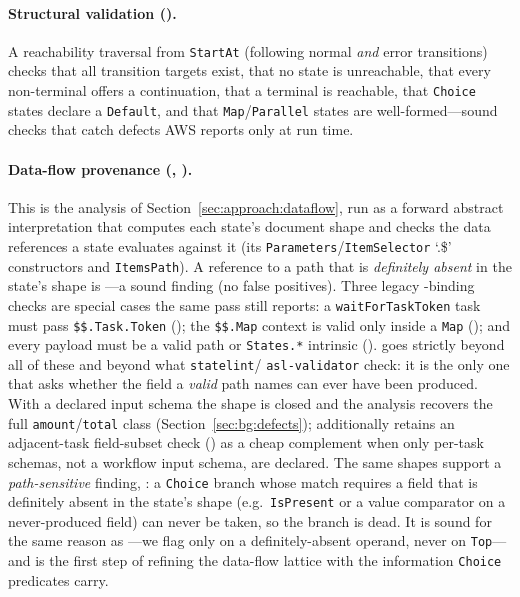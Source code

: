 \paragraph{Structural validation ().}
A reachability traversal from \texttt{StartAt} (following normal \emph{and} error
transitions) checks that all transition targets exist, that no state is unreachable, that
every non-terminal offers a continuation, that a terminal is reachable, that
\texttt{Choice} states declare a \texttt{Default}, and that \texttt{Map}/\texttt{Parallel}
states are well-formed---sound checks that catch defects AWS reports only at run time.

\paragraph{Data-flow provenance (, ).}
This is the analysis of Section~\ref{sec:approach:dataflow}, run as a forward abstract
interpretation that computes each state's document shape and checks the data references
a state evaluates against it (its \texttt{Parameters}/\texttt{ItemSelector} `.\$'
constructors and \texttt{ItemsPath}). A reference to a path that is \emph{definitely
absent} in the state's shape is ---a sound finding (no false positives). Three legacy
\asl-binding checks are special cases the same pass still reports: a
\texttt{waitForTaskToken} task must pass \texttt{\$\$.Task.Token} (); the
\texttt{\$\$.Map} context is valid only inside a \texttt{Map} (); and every
payload must be a valid path or \texttt{States.*} intrinsic (). 
goes strictly beyond all of these and beyond what \texttt{statelint}/%
\texttt{asl-validator} check: it is the only one that asks whether the field a
\emph{valid} path names can ever have been produced. With a declared input schema the
shape is closed and the analysis recovers the full \texttt{amount}/\texttt{total} class
(Section~\ref{sec:bg:defects}); \tool{} additionally retains an adjacent-task
field-subset check () as a cheap complement when only per-task schemas, not
a workflow input schema, are declared. The same shapes support a \emph{path-sensitive}
finding, : a \texttt{Choice} branch whose match requires a field that is
definitely absent in the state's shape (e.g.\ \texttt{IsPresent} or a value comparator on
a never-produced field) can never be taken, so the branch is dead. It is sound for the
same reason as ---we flag only on a definitely-absent operand, never on
\texttt{Top}---and is the first step of refining the data-flow lattice with the
information \texttt{Choice} predicates carry.

